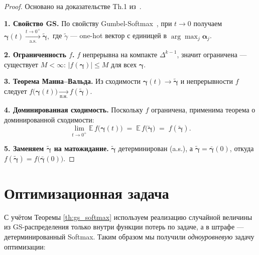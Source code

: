 \documentclass{article}
\begin{document}
\begin{proof} Основано на доказательстве Th.1 из~\cite{yakovlev2021neural}.


\textbf{1. Свойство GS.} 
По свойству Gumbel-Softmax~\cite{jang2017gumbel,maddison2017concrete}, при $t \rightarrow 0$ получаем 
\(
  \boldsymbol\gamma(t)\xrightarrow[\text{a.s.}]{t\to0^+}\boldsymbol{\tilde\gamma},
\)
где $\tilde\gamma$ — one-hot вектор с единицей в
$\displaystyle\arg\max_{j}\boldsymbol\alpha_j$.

\textbf{2. Ограниченность $f$.}
$f$ непрерывна на компакте $\Delta^{k-1}$, значит ограничена ---
существует $M\!<\infty$: $|f(\boldsymbol\gamma)|\le M$ для всех $\boldsymbol\gamma$.

\textbf{3. Теорема Манна–Вальда.}
Из сходимости $\boldsymbol\gamma(t)\!\to\!\boldsymbol{\tilde\gamma}$ и непрерывности $f$ следует
$f\bigl(\boldsymbol\gamma(t)\bigr)\!\xrightarrow[\text{п.н.}]{}f(\boldsymbol{\tilde\gamma})$.

\textbf{4. Доминированная сходимость.}
Поскольку $f$ ограничена, применима теорема о доминированной
сходимости:
$$
   \lim_{t\to0^{+}}
      \mathbb E\,f\bigl(\boldsymbol\gamma(t)\bigr)
   \;=\;
      \mathbb E\,f\bigl(\boldsymbol{\tilde\gamma}\bigr)
   \;=\;
      f(\boldsymbol{\tilde\gamma}).
$$

\textbf{5. Заменяем $\boldsymbol{\tilde\gamma}$ на матожидание.}
$\boldsymbol{\tilde\gamma}$ детерминирован (a.s.), а
$\boldsymbol{\tilde\gamma}=\boldsymbol{\bar\gamma}(0)$, откуда
$
   f(\boldsymbol{\tilde\gamma})=f\bigl(\boldsymbol{\bar\gamma}(0)\bigr).
$
\end{proof}




\section{Оптимизационная задача}

С учётом Теоремы \ref{th:gs_softmax} используем реализацию случайной величины из GS-распределения только внутри функции потерь по задаче, а в штрафе — детерминированный Softmax.
Таким образом мы получили \textit{одноуровневую} задачу оптимизации:
\end{document}
